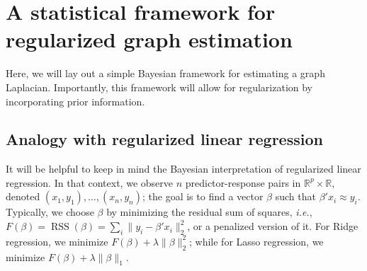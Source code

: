 \documentclass[12pt]{article}
\newcommand{\reals}{\mathbb{R}}
\DeclareMathOperator*{\RSS}{RSS}
\theoremstyle{plain}
\begin{document}
\vspace{-2mm}
\section{A statistical framework for regularized graph estimation}
\label{snx:framework}
\vspace{-1mm}

Here, we will lay out a simple Bayesian framework for estimating a graph 
Laplacian.
Importantly, this framework will allow for regularization by incorporating 
prior information.  


\vspace{-2mm}
\subsection{Analogy with regularized linear regression}
\label{S:regression}

It will be helpful to keep in mind the Bayesian interpretation of 
regularized linear regression.  
In that context, we observe $n$ predictor-response pairs in 
$\reals^p \times \reals$, denoted $(x_1, y_1), \dotsc, (x_n, y_n)$; 
the goal is to find a vector $\beta$ such that $\beta' x_i \approx y_i$.  
Typically, we choose $\beta$ by minimizing the residual sum of squares,
\emph{i.e.}, $F(\beta)=\RSS(\beta) = \sum_i \| y_i - \beta' x_i \|_2^2$, or 
a penalized version of it.  
For Ridge regression, we minimize $F(\beta) + \lambda \|\beta\|_2^2$; while 
for Lasso regression, we minimize $F(\beta) + \lambda \|\beta\|_1$.  
\end{document}
